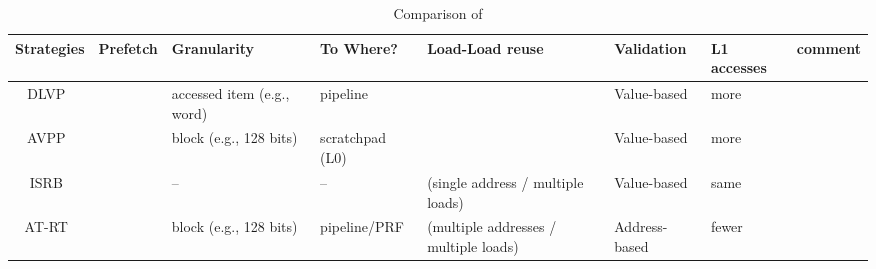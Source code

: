 \documentclass{sig-alternate}
\newcommand{\cmark}{\textcolor{ForestGreen}{\ding{51}}}%
\newcommand{\xmark}{\textcolor{red}{\ding{55}}}%
\begin{document}
\begin{scriptsize}
\begin{table}[h!]
  \centering
  \begin{tabular}{|c|c|p{20mm}|p{20mm}|p{25mm}|p{20mm}|p{10mm}|p{20mm}|}
    \hline
    \textbf{Strategies} & 
    \textbf{Prefetch} & 
    \textbf{Granularity} & 
    \textbf{To Where?} &
    \textbf{Load-Load reuse} & 
    \textbf{Validation} & 
    \textbf{L1 accesses} & 
    \textbf{comment}\\
    \hline
    
    \hline
    DLVP~\cite{} &  \cmark & {\color{orange}accessed \newline item (e.g., word)} & pipeline & \xmark &  {\color{red} Value-based} &  {\color{red} more} &    \\
    \hline
    AVPP~\cite{} &  \cmark & {\color{ForestGreen}block} \newline (e.g., 128 bits) & scratchpad \newline (L0)  & \xmark & {\color{red} Value-based} &  {\color{red} more} &   \\
    \hline
    ISRB~\cite{} &  \xmark & -- & -- & \cmark ({\color{orange}single address} / {\color{ForestGreen}multiple loads}) & {\color{red} Value-based} &  {\color{black} same} &    \\
    \hline
    AT-RT~\cite{} &  \cmark & {\color{ForestGreen}block} \newline (e.g., 128 bits)& pipeline/PRF & \cmark ({\color{ForestGreen}multiple addresses} / {\color{ForestGreen}multiple loads}) &  {\color{ForestGreen} Address-based} & {\color{ForestGreen} fewer} &    \\
    \hline

    
    \hline
  \end{tabular}
  \caption{Comparison of }
  \label{table:formatting}
\end{table}
\end{scriptsize}
\end{document}
